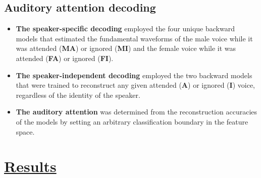 \documentclass[a0,landscape]{a0poster}
\newenvironment{nitemize}{%
  \begin{itemize}[topsep=6pt,itemsep=2pt,parsep=0pt]%
}{%
  \end{itemize}%
}
\begin{document}
\begin{multicols*}{3}
\subsection*{Auditory attention decoding}
\vspace{14pt}
\begin{nitemize}
\item \textbf{The speaker-specific decoding} employed the four unique backward models that estimated the fundamental waveforms of the male voice while it was attended (\textbf{MA}) or ignored (\textbf{MI}) and the female voice while it was attended (\textbf{FA}) or ignored (\textbf{FI}).
\item \textbf{The speaker-independent decoding} employed the two backward models that were trained to reconstruct any given attended (\textbf{A}) or ignored (\textbf{I}) voice, regardless of the identity of the speaker.
\item \textbf{The auditory attention} was determined from the reconstruction accuracies of the models by setting an arbitrary classification boundary in the feature space.
\end{nitemize}


\section*{\underline{Results}}


\end{multicols*}
\end{document}
